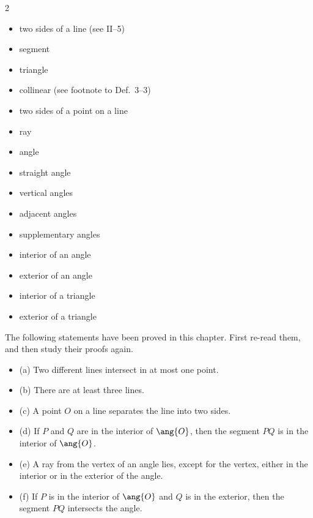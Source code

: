 \documentclass[11pt]{book}
\theoremstyle{bkplain}
\theoremstyle{XIplainnote}
\theoremstyle{bkplain}
\theoremstyle{bkplain}
\begin{document}
\begin{multicols}{2}
\begin{itemize}[label=,leftmargin=1.2em,itemsep=0pt,topsep=2pt]
\item two sides of a line (see II--5)
\item segment
\item triangle
\item collinear (see footnote to Def.~3--3)
\item two sides of a point on a line
\item ray
\item angle
\item straight angle
\item vertical angles
\item adjacent angles
\item supplementary angles
\item interior of an angle
\item exterior of an angle
\item interior of a triangle
\item exterior of a triangle
\end{itemize}
\end{multicols}

\begin{exlist}[start=3]
\item The following statements have been proved in this chapter. First re-read
      them, and then study their proofs again.
      \begin{itemize}[label=,leftmargin=1.4em,itemsep=1pt,topsep=2pt]
      \item (a) Two different lines intersect in at most one point.
      \item (b) There are at least three lines.
      \item (c) A point $O$ on a line separates the line into two sides.
      \item (d) If $P$ and $Q$ are in the interior of $\ang{O}$, then the segment
            $PQ$ is in the interior of $\ang{O}$.
      \item (e) A ray from the vertex of an angle lies, except for the vertex,
            either in the interior or in the exterior of the angle.
      \item (f) If $P$ is in the interior of $\ang{O}$ and $Q$ is in the
            exterior, then the segment $PQ$ intersects the angle.
      \end{itemize}
\end{exlist}
\end{document}
